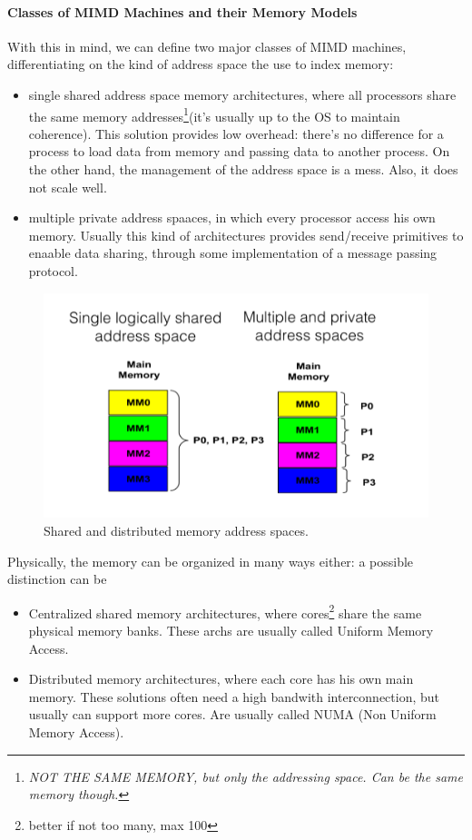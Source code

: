 \documentclass[10pt,a4paper]{article}
\begin{document}
				\paragraph{Classes of MIMD Machines and their Memory Models}
					With this in mind, we can define two major classes of MIMD machines, differentiating on the kind of address space the use to index memory:
					\begin{itemize}
						\item single shared address space memory architectures, where all processors share the same memory addresses\footnote{\emph{NOT THE SAME MEMORY, but only the addressing space. Can be the same memory though.}}(it's usually up to the OS to maintain coherence). This solution provides low overhead: there's no difference for a process to load data from memory and passing data to another process. On the other hand, the management of the address space is a mess. Also, it does not scale well.
						\item multiple private address spaaces, in which every processor access his own memory. Usually this kind of architectures provides send/receive primitives to enaable data sharing, through some implementation of a message passing protocol. 
					\end{itemize}
					\begin{figure}[H]
						\centering
						\includegraphics[width = \textwidth]{./images/memoryModels.png}
						\caption{Shared and distributed memory address spaces.}
					\end{figure}
					Physically, the memory can be organized in many ways either: a possible distinction can be
					\begin{itemize}
						\item Centralized shared memory architectures, where cores\footnote{better if not too many, max 100} share the same physical memory banks. These archs are usually called Uniform Memory Access.
						\item Distributed memory architectures, where each core has his own main memory. These solutions often need a high bandwith interconnection, but usually can support more cores. Are usually called NUMA (Non Uniform Memory Access).
					\end{itemize}
\end{document}

